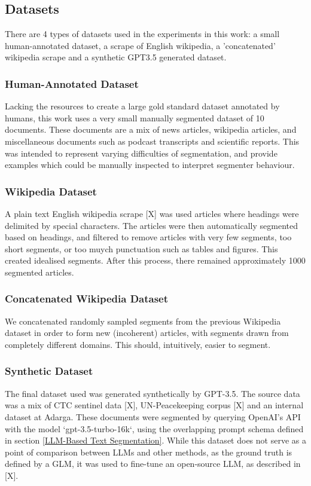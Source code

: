 \subsection{Datasets}

There are 4 types of datasets used in the experiments in this work: a small human-annotated dataset, a scrape of English wikipedia, a 'concatenated' wikipedia scrape and a synthetic GPT3.5 generated dataset.

\subsubsection{Human-Annotated Dataset}

Lacking the resources to create a large gold standard dataset annotated by humans, this work uses a very small manually segmented dataset of 10 documents. These documents are a mix of news articles, wikipedia articles, and miscellaneous documents such as podcast transcripts and scientific reports. This was intended to represent varying difficulties of segmentation, and provide examples which could be manually inspected to interpret segmenter behaviour.

\subsubsection{Wikipedia Dataset}

A plain text English wikipedia scrape [X] was used articles where headings were delimited by special characters. The articles were then automatically segmented based on headings, and filtered to remove articles with very few segments, too short segments, or too muych punctuation such as tables and figures. This created idealised segments. After this process, there remained approximately 1000 segmented articles.

\subsubsection{Concatenated Wikipedia Dataset}

We concatenated randomly sampled segments from the previous Wikipedia dataset in order to form new (incoherent) articles, with segments drawn from completely different domains. This should, intuitively, easier to segment.

\subsubsection{Synthetic Dataset}

The final dataset used was generated synthetically by GPT-3.5. The source data was a mix of CTC sentinel data [X], UN-Peacekeeping corpus [X] and an internal dataset at Adarga. These documents were segmented by querying OpenAI's API with the model `gpt-3.5-turbo-16k`, using the overlapping prompt schema defined in section \ref{LLM-Based Text Segmentation}. While this dataset does not serve as a point of comparison between LLMs and other methods, as the ground truth is defined by a GLM, it was used to fine-tune an open-source LLM, as described in [X].